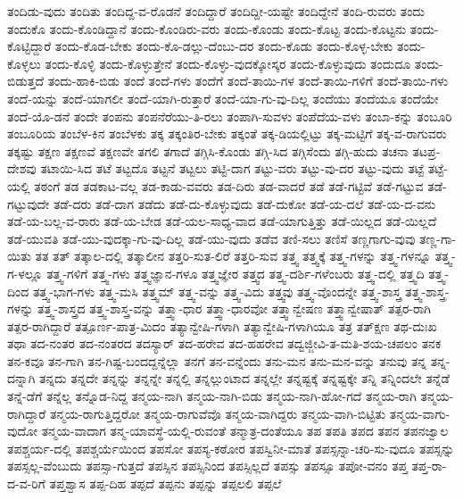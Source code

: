 {ತಂದಿಡು-ವುದು
ತಂದಿತು
ತಂದಿದ್ದ-ವ-ರೊಡನೆ
ತಂದಿದ್ದಾರೆ
ತಂದಿದ್ದೀ-ಯಷ್ಟೇ
ತಂದಿದ್ದೇನೆ
ತಂದಿ-ರುವರು
ತಂದು
ತಂದುಕೊ
ತಂದು-ಕೊಂಡಿದ್ದಾನೆ
ತಂದು-ಕೊಂಡಿರು-ವರು
ತಂದು-ಕೊಂಡು
ತಂದು-ಕೊಟ್ಟ
ತಂದು-ಕೊಟ್ಟನು
ತಂದು-ಕೊಟ್ಟಿದ್ದಾರೆ
ತಂದು-ಕೊಡ-ಬೇಕು
ತಂದು-ಕೊ-ಡಲ್ಲು-ದೆಂಬು-ದರ
ತಂದು-ಕೊಡು
ತಂದು-ಕೊಳ್ಳ-ಬೇಕು
ತಂದು-ಕೊಳ್ಳಲು
ತಂದು-ಕೊಳ್ಳಿ
ತಂದು-ಕೊಳ್ಳುತ್ತೇನೆ
ತಂದು-ಕೊಳ್ಳು-ವುದಕ್ಕೋಸ್ಕರ
ತಂದು-ಕೊಳ್ಳುವುದು
ತಂದುದೂ
ತಂದು-ಬಿಡುತ್ತದೆ
ತಂದು-ಹಾಕಿ-ಬಿಡು
ತಂದೆ
ತಂದೆ-ಗಳು
ತಂದೆಗೆ
ತಂದೆ-ತಾಯಿ-ಗಳ
ತಂದೆ-ತಾಯಿ-ಗಳಿಗೆ
ತಂದೆ-ತಾಯಿ-ಗಳು
ತಂದೆ-ಯನ್ನು
ತಂದೆ-ಯಾಗಲೀ
ತಂದೆ-ಯಾಗಿ-ರುತ್ತಾರೆ
ತಂದೆ-ಯಾ-ಗು-ವು-ದಿಲ್ಲ
ತಂದೆಯು
ತಂದೆಯೂ
ತಂದೆಯೇ
ತಂದೆ-ಯೊ-ಡನೆ
ತಂದೇ
ತಂಪನು
ತಂಪನೆರೆಯು-ತಿ-ರಲು
ತಂಪಾಗಿ-ಸುವಳು
ತಂಪೆದೆಯ-ವಳು
ತಂಬಾ-ಕನ್ನು
ತಂಬೂರಿ
ತಂಬೂರಿಯ
ತಂಬೆಳ-ಕಿನ
ತಂಬೆಳಕು
ತಕ್ಕ
ತಕ್ಕಂತಿರ-ಬೇಕು
ತಕ್ಕಂತೆ
ತಕ್ಕ-ಡಿಯಲ್ಲಿಟ್ಟು
ತಕ್ಕ-ಮಟ್ಟಿಗೆ
ತಕ್ಕ-ವ-ರಾಗುವರು
ತಕ್ಕಷ್ಟು
ತಕ್ಷಣ
ತಕ್ಷಣವೆ
ತಕ್ಷಣವೇ
ತಗಲಿ
ತಗಾದೆ
ತಗ್ಗಿಸಿ-ಕೊಂಡು
ತಗ್ಗಿ-ಸಿದ
ತಗ್ಗಿಸೆಂದು
ತಗ್ಗಿ-ಹುದು
ತಚನಾ
ತಟಪ್ರ-ದೇಶವು
ತಟಾಯಿ-ಸಿದ
ತಟೆ
ತಟ್ಟದೊ
ತಟ್ಟನೆ
ತಟ್ಟಲು
ತಟ್ಟಿ-ದಾಗ
ತಟ್ಟು-ವರು
ತಟ್ಟು-ವು-ದರ
ತಟ್ಟು-ವುದು
ತಟ್ಟೆ
ತಟ್ಟೆ-ಯಲ್ಲಿ
ತಠಂಗೆ
ತಡ
ತಡಕಾಟ-ವಲ್ಲ
ತಡ-ಕಾಡು-ವವರು
ತಡ-ದಿರು
ತಡ-ವಾದರೆ
ತಡೆ
ತಡೆ-ಗಟ್ಟಿವೆ
ತಡೆ-ಗಟ್ಟುವ
ತಡೆ-ಗಟ್ಟುವುದೇ
ತಡೆ-ದರು
ತಡೆ-ದಾಗ
ತಡೆದು
ತಡೆ-ದು-ಕೊಳ್ಳುವುದು
ತಡೆ-ದುಕೋ
ತಡೆ-ಯ-ದಲೆ
ತಡೆ-ಯ-ದ-ವನು
ತಡೆ-ಯ-ಬಲ್ಲ-ವ-ರಾರು
ತಡೆ-ಯ-ಬೇಡ
ತಡೆ-ಯಲ-ಸಾಧ್ಯ-ವಾದ
ತಡೆ-ಯಾಗುತ್ತಿತ್ತು
ತಡೆ-ಯಿಲ್ಲದ
ತಡೆ-ಯಿಲ್ಲದೆ
ತಡೆ-ಯುವತಿ
ತಡೆ-ಯು-ವುದಕ್ಕಾ-ಗು-ವು-ದಿಲ್ಲ
ತಡೆ-ಯು-ವುದು
ತಡೆವ
ತಣಿ-ಸಲು
ತಣಿಸೆ
ತಣ್ಣಗಾಗು-ವುವು
ತಣ್ಣ-ಗಾ-ಯಿತು
ತತ
ತತ್
ತತ್ಕಾಲ-ದಲ್ಲಿ
ತತ್ಕಾಲೀನ
ತತ್ತರಿ-ಸುತ-ಲಿರೆ
ತತ್ತರಿ-ಸುವ
ತತ್ತ್ವ
ತತ್ತ್ವಕ್ಕೆ
ತತ್ತ್ವ-ಗಳನ್ನು
ತತ್ತ್ವ-ಗಳನ್ನೂ
ತತ್ತ್ವ-ಗ-ಳಲ್ಲೂ
ತತ್ತ್ವ-ಗಳಿಗೆ
ತತ್ತ್ವ-ಗಳು
ತತ್ತ್ವಜ್ಞಾನ-ಗಳೂ
ತತ್ತ್ವಜ್ಞೇರ
ತತ್ತ್ವದ
ತತ್ತ್ವ-ದರ್ಶಿ-ಗಳೆಂಬರು
ತತ್ತ್ವ-ದಲ್ಲಿ
ತತ್ತ್ವದಿ
ತತ್ತ್ವ-ದಿಂದ
ತತ್ತ್ವ-ಭಾಗ-ಗಳು
ತತ್ತ್ವ-ಮಸಿ
ತತ್ತ್ವಮ್
ತತ್ತ್ವ-ವನ್ನು
ತತ್ತ್ವ-ವಿದು
ತತ್ತ್ವವು
ತತ್ತ್ವ-ವೊಂದನ್ನೇ
ತತ್ತ್ವ-ಶಾಸ್ತ್ರ
ತತ್ತ್ವ-ಶಾಸ್ತ್ರ-ಗಳನ್ನು
ತತ್ತ್ವ-ಶಾಸ್ತ್ರದ
ತತ್ತ್ವ-ಶಾಸ್ತ್ರ-ವನ್ನು
ತತ್ತ್ವಾ-ಧಾರ
ತತ್ತ್ವಾ-ಧಾರವೋ
ತತ್ತ್ವಾನ್ವೇಷಣ
ತತ್ತ್ವಾನ್ವೇಷಾತ್
ತತ್ಪರ-ರಾಗಿ
ತತ್ಪರ-ರಾಗಿದ್ದಾರೆ
ತತ್ಪೂರ್ಣ-ಪಾತ್ರ-ಮಿದಂ
ತತ್ಯಾನ್ವೇಷಿ-ಗಳಾಗಿ
ತತ್ಯಾನ್ವೇಷಿ-ಗಳಾಗಿಯೂ
ತತ್ರ
ತತ್ಕ್ಷಣ
ತಥ-ದುಃಖ
ತಥಾ
ತದ-ನಂತರ
ತದ-ನಂತರದ
ತದಸ್ಯಾರ್
ತದ-ಹರೇವ
ತದ-ಹಹರೇವ
ತದ್ವಜ್ಜೀವಿ-ತ-ಮತಿ-ಶಯ-ಚಪಲಂ
ತನಕ
ತನ-ಕವೂ
ತನ-ಗಾಗಿ
ತನ-ಗಿಷ್ಟ-ಬಂದದ್ದನ್ನೆಲ್ಲಾ
ತನಗೆ
ತನ-ವನ್ನೆಂದು
ತನು-ಮನ
ತನು-ಮನ-ವನ್ನು
ತನುವು
ತನ್ನ
ತನ್ನ-ದನ್ನಾಗಿ
ತನ್ನದು
ತನ್ನದೇ
ತನ್ನನ್ನು
ತನ್ನನ್ನೇ
ತನ್ನಲ್ಲಿ
ತನ್ನಲ್ಲುಂಟಾದ
ತನ್ನಲ್ಲೇ
ತನ್ನಷ್ಟಕ್ಕೆ
ತನ್ನಷ್ಟಕ್ಕೇ
ತನ್ನಿ
ತನ್ನಿಂದಲೇ
ತನ್ನೆಡೆ
ತನ್ನೆ-ಡೆಗೆ
ತನ್ನೆಲ್ಲ
ತನ್ನೊಡ-ನಿದ್ದ
ತನ್ಮಯ-ನಾಗಿ
ತನ್ಮಯ-ನಾಗಿ-ಬಿಡು
ತನ್ಮಯ-ನಾಗಿ-ಹೋ-ಗದೆ
ತನ್ಮಯ-ರಾಗಿ
ತನ್ಮಯ-ರಾಗಿದ್ದಾರೆ
ತನ್ಮಯ-ರಾಗುತ್ತಿದ್ದರೋ
ತನ್ಮಯ-ರಾಗುವೆವೊ
ತನ್ಮಯ-ವಾಗಿದ್ದರು
ತನ್ಮಯ-ವಾಗಿ-ಬಿಟ್ಟಿತು
ತನ್ಮಯ-ವಾಗು-ವುದೋ
ತನ್ಮಯ-ವಾದಾಗ
ತನ್ಮ-ಯಾವಸ್ಥೆ-ಯಲ್ಲಿ-ರುವಂತೆ
ತನ್ಮಾತ್ರ-ದಂತೆಯೂ
ತಪ
ತಪತಿ
ತಪದ
ತಪನ
ತಪನಜ್ವಾಲ
ತಪಶ್ಚರ್ಯ-ದಲ್ಲಿ
ತಪಶ್ಚರ್ಯೆಯಿಂದ
ತಪಸೋ
ತಪಸ್ಯ-ಕಠೋರ
ತಪಸ್ವಿನೀ-ಮಾತೆ
ತಪಸ್ಸನ್ನಾ-ಚರಿ-ಸು-ವುದೂ
ತಪಸ್ಸನ್ನು
ತಪಸ್ಸಲ್ಲ-ವೆಂಬುದು
ತಪಸ್ಸಾ-ಗುತ್ತದೆ
ತಪಸ್ಸಿನ
ತಪಸ್ಸಿನಿಂದ
ತಪಸ್ಸಿಲ್ಲದೆ
ತಪಸ್ಸು
ತಪಸ್ಸೂ
ತಪೋ-ವನಂ
ತಪ್ತ
ತಪ್ತ-ರಾ-ದ-ವ-ರಿಗೆ
ತಪ್ತಶ್ವಾಸ
ತಪ್ಪ-ದಿಹ
ತಪ್ಪದೆ
ತಪ್ಪನು
ತಪ್ಪನ್ನು
ತಪ್ಪಲಲಿ
ತಪ್ಪಲೆ
}
